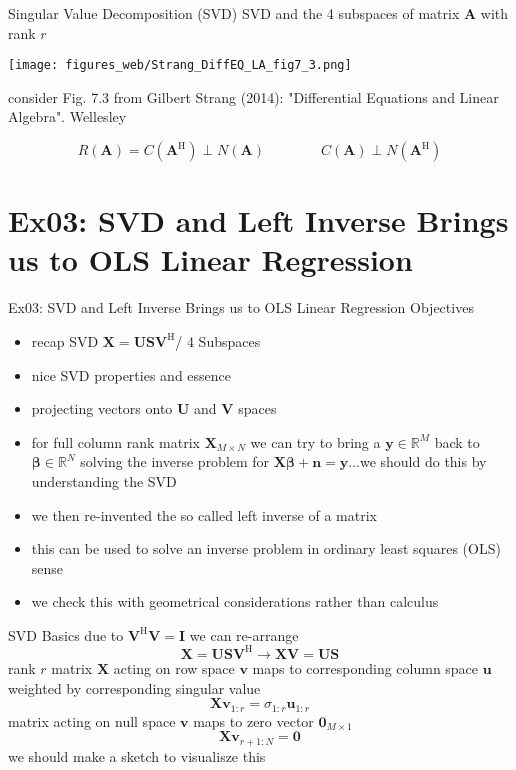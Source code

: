 \documentclass[mathserif, aspectratio=43]{intbeamer}
\begin{document}
\begin{frame}{Singular Value Decomposition (SVD)}
SVD and the 4 subspaces of matrix $\bm{A}$ with rank $r$
\begin{center}
\texttt{[image: figures\_web/Strang\_DiffEQ\_LA\_fig7\_3.png]}
\end{center}
\begin{footnotesize}consider Fig. 7.3 from Gilbert Strang (2014): "Differential Equations and Linear Algebra". Wellesley\end{footnotesize}

$$R(\bm{A}) = C(\bm{A}^\mathrm{H})\perp N(\bm{A})
\qquad\qquad C(\bm{A}) \perp N(\bm{A}^\mathrm{H})$$

\end{frame}


\section{Ex03: SVD and Left Inverse Brings us to OLS Linear Regression}

\begin{frame}{Ex03: SVD and Left Inverse Brings us to OLS Linear Regression}
Objectives
\begin{itemize}
\item recap SVD $\bm{X} = \bm{U} \bm{S} \bm{V}^\mathrm{H}$/ 4 Subspaces
\item nice SVD properties and essence
\item projecting vectors onto $\bm{U}$ and $\bm{V}$ spaces
\item for full column rank matrix $\bm{X}_{M \times N}$ we can try to bring a $\bm{y}\in \mathbb{R}^M$ back to $\bm{\beta}\in \mathbb{R}^N$ solving the inverse problem for $\bm{X} \bm{\beta} + \bm{n} = \bm{y}$...we should do this by understanding the SVD
\item we then re-invented the so called left inverse of a matrix
\item this can be used to solve an inverse problem in ordinary least squares (OLS) sense
\item we check this with geometrical considerations rather than calculus
\end{itemize}
\end{frame}




\begin{frame}{SVD Basics}
due to $\bm{V}^\mathrm{H}\bm{V}=\bm{I}$ we can re-arrange
$$\bm{X} = \bm{U} \bm{S} \bm{V}^\mathrm{H} \rightarrow
\bm{X} \bm{V} = \bm{U} \bm{S}$$
rank $r$ matrix $\bm{X}$ acting on row space $\bm{v}$ maps to corresponding column space $\bm{u}$ weighted by corresponding singular value
$$\bm{X} \bm{v}_{1:r} = \sigma_{1:r} \bm{u}_{1:r}$$
matrix acting on null space $\bm{v}$ maps to zero vector $\bm{0}_{M \times 1}$
$$\bm{X} \bm{v}_{r+1:N} = \bm{0}$$
we should make a sketch to visualisze this
\end{frame}
\end{document}
